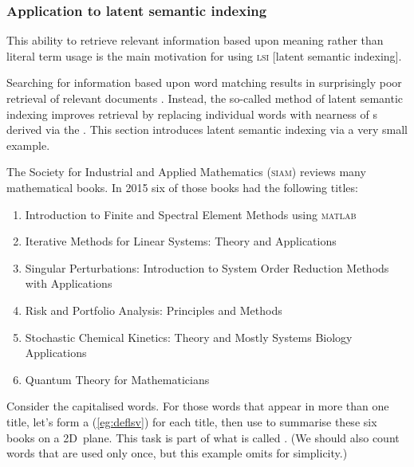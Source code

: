 




\subsubsection{Application to latent semantic indexing}
\label{sec:alsi}

\begin{quoted}{\cite[p.579]{Berry95}}
This ability to retrieve relevant information based upon meaning rather than literal term usage is the main motivation for using \textsc{lsi} [latent semantic indexing].
\end{quoted}

Searching for information based upon word matching results in surprisingly poor retrieval of relevant documents \cite[\S5.5]{Berry95}.
Instead, the so-called method of latent semantic indexing improves 
retrieval by replacing individual words with nearness of s 
derived via the .
This section introduces latent semantic indexing via a very small example. 


The Society for Industrial and Applied Mathematics (\textsc{siam}) reviews many mathematical books.
In 2015 six of those books had the following titles:
\begin{enumerate}
\item Introduction to Finite and Spectral Element Methods using \textsc{matlab}
\item Iterative Methods for Linear Systems: Theory and Applications 
\item Singular Perturbations: Introduction to System Order Reduction Methods with Applications 
\item Risk and Portfolio Analysis: Principles and Methods 
\item Stochastic Chemical Kinetics: Theory and Mostly Systems Biology Applications
\item Quantum Theory for Mathematicians 
\end{enumerate}
Consider the capitalised words. 
For those words that appear in more than one title, let's form a  (\autoref{eg:deflsv}) for each title, then use  to summarise these six books on a 2D~plane.
This task is part of what is called  \cite[]{Berry95}.  
(We should also count words that are used only once, but this example omits for simplicity.)

